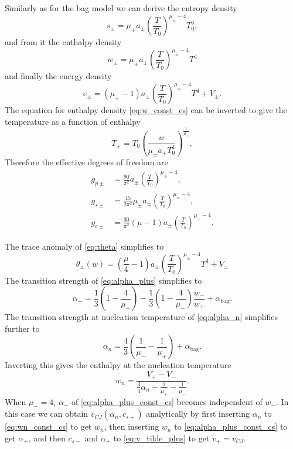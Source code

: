 Similarly as for the bag model we can derive the entropy density
\begin{equation}
s_\pm = \mu_\pm a_\pm \left( \frac{T}{T_0} \right)^{\mu_\pm - 4} T_0^3,
\end{equation}
and from it the enthalpy density
\begin{equation}
w_\pm = \mu_\pm a_\pm \left( \frac{T}{T_0} \right)^{\mu_\pm - 4} T^4
\label{eq:w_const_cs}
\end{equation}
and finally the energy density
\begin{equation}
e_\pm = (\mu_\pm - 1) a_\pm \left( \frac{T}{T_0} \right)^{\mu_\pm - 4} T^4 + V_\pm.
\end{equation}
The equation for enthalpy density \eqref{eq:w_const_cs} can be inverted to give the temperature as a function of enthalpy
\begin{equation}
T_\pm = T_0 \left( \frac{w}{\mu_\pm a_\pm T_0^4} \right)^\frac{1}{\mu_\pm},
\end{equation}
Therefore the effective degrees of freedom are
\begin{align}
g_{p\pm} &= \frac{90}{\pi^2} a_\pm \left( \frac{T}{T_0} \right)^{\mu_\pm - 4}, \\
g_{s\pm} &= \frac{45}{2\pi^2} \mu_\pm a_\pm \left( \frac{T}{T_0} \right)^{\mu_\pm - 4}, \\
g_{e\pm} &= \frac{30}{\pi^2} (\mu - 1) a_\pm \left( \frac{T}{T_0} \right)^{\mu_\pm - 4}.
\end{align}


The trace anomaly of \eqref{eq:theta} simplifies to
\begin{equation}
\theta_\pm(w) = \left( \frac{\mu}{4} - 1 \right) a_\pm \left( \frac{T}{T_0} \right)^{\mu_\pm - 4} T^4 + V_\pm
\end{equation}
The transition strength of \eqref{eq:alpha_plus} simplifies to
\begin{equation}
\alpha_+ = \frac{1}{3} \left( 1 - \frac{4}{\mu_+} \right) - \frac{1}{3} \left(1 - \frac{4}{\mu_-} \right) \frac{w_-}{w_+} + \alpha_\text{bag}.
\label{eq:alpha_plus_const_cs}
\end{equation}
The transition strength at nucleation temperature of \eqref{eq:alpha_n} simplifies further to
\begin{equation}
\alpha_n = \frac{4}{3} \left( \frac{1}{\mu_-} - \frac{1}{\mu_+} \right) + \alpha_\text{bag}.
\end{equation}
Inverting this gives the enthalpy at the nucleation temperature
\begin{equation}
w_n = \frac{V_+ - V_-}{ \frac{3}{4} \alpha_n + \frac{1}{\mu_+} - \frac{1}{\mu_-} }.
\label{eq:wn_const_cs}
\end{equation}
When $\mu_- = 4$, $\alpha_+$ of \eqref{eq:alpha_plus_const_cs} becomes independent of $w_-$.
In this case we can obtain $v_{CJ}(\alpha_n, c_{s+})$ analytically by first inserting $\alpha_n$ to \eqref{eq:wn_const_cs} to get $w_n$,
then inserting $w_n$ to \eqref{eq:alpha_plus_const_cs} to get $\alpha_+$, and then $c_{s-}$ and $\alpha_+$ to \eqref{eq:v_tilde_plus} to get $\tilde{v}_+ = v_{CJ}$.

